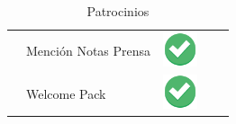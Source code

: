 \documentclass[12pt]{article}
\begin{document}
\begin{table}[ht]
\begin{tabular}{>{\centering\arraybackslash}m{3cm} >{\centering\arraybackslash}m{4cm} >{\centering\arraybackslash}m{2cm} >{\centering\arraybackslash}m{2cm} >{\centering\arraybackslash}m{2cm} }
                    & Mención Notas Prensa & \includegraphics[height=1cm]{Tick Verde.png}& &\\
                    & Welcome Pack    & \includegraphics[height=1cm]{Tick Verde.png}& &\\
    \bottomrule
 \end{tabular}
 \caption{Patrocinios}
 \end{table}
 
 
\end{document}
